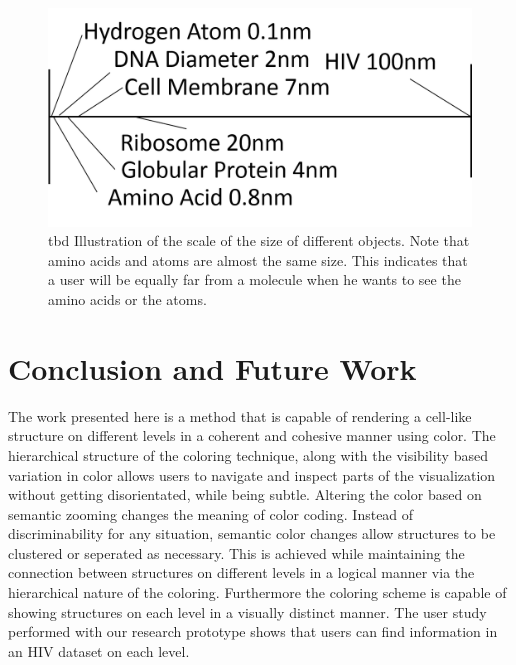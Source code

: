 \documentclass[review,journal]{vgtc}         %
\begin{document}
	\begin{figure}
		\centering
		\includegraphics[width=1\linewidth]{Figures/hivscale}
		\caption{tbd Illustration of the scale of the size of different objects. Note that amino acids and atoms are almost the same size. This indicates that a user will be equally far from a molecule when he wants to see the amino acids or the atoms.}
		\label{fig:hivScale}
	\end{figure}
	
	
	
	\section{Conclusion and Future Work}
	The work presented here is a method that is capable of rendering a cell-like structure on different levels in a coherent and cohesive manner using color. 
	The hierarchical structure of the coloring technique, along with the visibility based variation in color allows users to navigate and inspect parts of the visualization without getting disorientated, while being subtle.
	Altering the color based on semantic zooming changes the meaning of color coding.
	Instead of discriminability for any situation, semantic color changes allow structures to be clustered or seperated as necessary.
	This is achieved while maintaining the connection between structures on different levels in a logical manner via the hierarchical nature of the coloring.
	Furthermore the coloring scheme is capable of showing structures on each level in a visually distinct manner. 
	The user study performed with our research prototype shows that users can find information in an HIV dataset on each level. 
	
	
	
	
	
	
	
\end{document}
